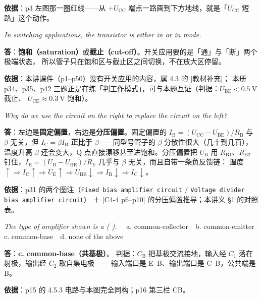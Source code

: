 \documentclass[11pt]{ctexart}
\begin{document}
\textbf{依据}：p3 左图那一圈红线——从 $+U_{\mathrm{CC}}$ 端点一路画到下方地线，就是「$U_{\mathrm{CC}}$ 短路」这个动作。


\textit{In switching applications, the transistor is either in \underline{\hspace{1.6cm}} or in \underline{\hspace{1.6cm}} mode.}

\textbf{答}：\textbf{饱和（saturation）}或\textbf{截止（cut-off）}。开关应用要的是「通」与「断」两个极端状态，
所以管子只在饱和区与截止区之间切换，不在放大区停留。

\textbf{依据}：本讲课件（p1--p50）没有开关应用的内容，属 4.3 的 [教材补充]；
本册 p34、p35、p42 三题正是在练「判工作模式」，可与本题互证（判据：$U_{\mathrm{BE}}<0.5\ \mathrm{V}$ 截止、
$U_{\mathrm{CE}}\approx0.3\ \mathrm{V}$ 饱和）。


\textit{Why do we use the circuit on the right to replace the circuit on the left?}

\textbf{答}：左边是\textbf{固定偏置}，右边是\textbf{分压偏置}。固定偏置的
$I_{\mathrm{B}}=(U_{\mathrm{CC}}-U_{\mathrm{BE}})/R_{\mathrm{B}}$ 与 $\beta$ 无关，但
$I_{\mathrm{C}}=\beta I_{\mathrm{B}}$ \textbf{正比于 $\beta$}——同型号管子的 $\beta$ 分散性很大（几十到几百），
温度升高 $\beta$ 还会变大，Q 点直接漂移甚至进饱和。分压偏置把 $U_{\mathrm{B}}$ 用
$R_{\mathrm{B1}}$、$R_{\mathrm{B2}}$ 钉住，$I_{\mathrm{E}}=(U_{\mathrm{B}}-U_{\mathrm{BE}})/R_{\mathrm{E}}$
几乎与 $\beta$ 无关，而且自带一条负反馈链：
温度 $\uparrow\Rightarrow I_{\mathrm{C}}\uparrow\Rightarrow U_{\mathrm{E}}\uparrow\Rightarrow U_{\mathrm{BE}}\downarrow\Rightarrow I_{\mathrm{B}}\downarrow\Rightarrow I_{\mathrm{C}}\downarrow$。

\textbf{依据}：p31 的两个图注（\texttt{Fixed bias amplifier circuit} / \texttt{Voltage divider bias amplifier circuit}）
＋ [C4-4 p6--p10] 的分压偏置推导；本讲义 §1 的对照表。


\textit{The type of amplifier shown is a ( ).} 　a. common-collector　b. common-emitter　c. common-base　d. none of the above

\textbf{答}：\textbf{c. common-base（共基极）}。
判据：$C_{\mathrm{B}}$ 把基极交流接地，输入经 $C_1$ 落在射极，输出经 $C_2$ 取自集电极——
输入端口是 E--B、输出端口是 C--B，公共端是 B。

\textbf{依据}：p15 的 4.5.3 电路与本图完全同构；p16 第三栏 CB。
\end{document}
